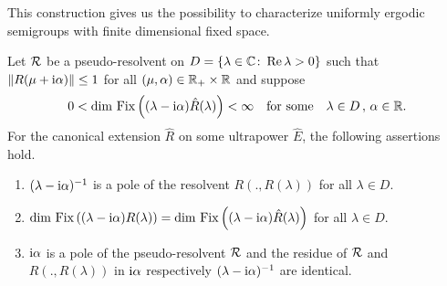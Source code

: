 This construction gives us the possibility to characterize uniformly ergodic semigroups with finite dimensional fixed space.
\begin{lemma}\label{lem:d3-2.2}
Let $\mathcal{R}$ be a pseudo-resolvent on $D = \{\lambda \in \mathbb{C} \colon \mathop{}\!\mathrm{Re}\,\lambda > 0\}$ such that $\|R(\mu+\mathrm{i}\alpha)\| \leq 1$ for all $(\mu,\alpha) \in \mathbb{R}_{+} \times \mathbb{R}$ and suppose
\[
0 < \dim \mathop{}\mathrm{Fix}\left((\lambda-\mathrm{i}\alpha)\hat{R}(\lambda)\right) < \infty \quad \text{for some} \quad \lambda \in D \, , \, \alpha \in \mathbb{R} .
\]
For the canonical extension $\hat{R}$ on some ultrapower $\hat{E}$, the following assertions hold.
\begin{enumerate}[\upshape (i)]
\item\label{d3-2.2-i}
$(\lambda - \mathrm{i}\alpha)^{-1}$ is a pole of the resolvent $R(.,R(\lambda))$ for all $\lambda \in D$.

\item\label{d3-2.2-ii}
$\dim \mathop{}\mathrm{Fix}\left((\lambda-\mathrm{i}\alpha)R(\lambda)\right) 
	= \dim \mathop{}\mathrm{Fix}\left((\lambda-\mathrm{i}\alpha)\hat{R}(\lambda)\right)$ for all $\lambda \in D$.

\item\label{d3-2.2-iii}
$\mathrm{i}\alpha$ is a pole of the pseudo-resolvent $\mathcal{R}$ and the residue of $\mathcal{R}$ and $R(.,R(\lambda))$ in $\mathrm{i}\alpha$ respectively $(\lambda - \mathrm{i}\alpha)^{-1}$ are identical.

\end{enumerate}
\end{lemma}
